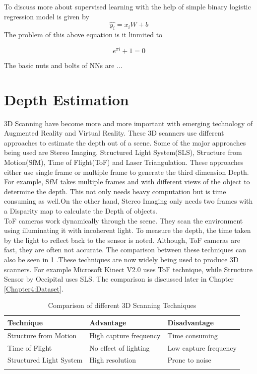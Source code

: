 To discuss more about supervised learning with the help of simple binary logistic regression model is given by
\begin{equation} \label{eq1}
    \hat{y_{i}} = x_{i}W + b 
\end{equation}
The problem of this above equation is it linmited to 


\begin{equation} \label{eq2}
    e^{\pi i} + 1 = 0
\end{equation}

The basic nuts and bolts of NNs are ...

\section{Depth Estimation}
3D Scanning have become more and more important with emerging technology of Augmented Reality and Virtual Reality. These 3D scanners use different approaches to estimate the depth out of a scene. Some of the major approaches being used are Stereo Imaging, Structured Light System(SLS), Structure from Motion(SfM), Time of Flight(ToF) and Laser Triangulation. These approaches either use single frame or multiple frame to generate the third dimension Depth. For example, SfM takes multiple frames and with different views of the object to determine the depth. This not only needs heavy computation but is time consuming as well.On the other hand, Stereo Imaging only needs two frames with a Disparity map to calculate the Depth of objects.\\

ToF cameras work dynamically through the scene. They scan the environment using illuminating it with incoherent light. To measure the depth, the time taken by the light to reflect back to the sensor is noted. Although, ToF cameras are fast, they are often not accurate. The comparison between these techniques can also be seen in \ref{table:3DScanning} .These techniques are now widely being used to produce 3D scanners. For example Microsoft Kinect V2.0 uses ToF technique, while Structure Sensor by Occipital uses SLS. The comparison is discussed later in Chapter \ref{Chapter4:Dataset}.\\

\begin{table}[h]
\begin{tabular}{@{}lll@{}}
\toprule
\textbf{Technique}                    & \textbf{Advantage}           & \textbf{Disadvantage}         \\ \midrule
Structure from Motion          & High capture frequency & Time consuming                 \\
Time of Flight       & No effect of lighting & Low capture frequency     \\
Structured Light System        & High resolution   & Prone to noise                 \\ 
                            &                     &                                               
\end{tabular}
\caption{Comparison of different 3D Scanning Techniques}
\label{table:3DScanning}
\end{table}

